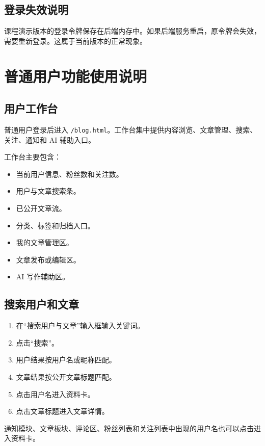 \documentclass[UTF8,a4paper,12pt]{ctexart}
\newcommand{\code}[1]{\texttt{#1}}
\begin{document}
\subsection{登录失效说明}

课程演示版本的登录令牌保存在后端内存中。如果后端服务重启，原令牌会失效，需要重新登录。这属于当前版本的正常现象。

\section{普通用户功能使用说明}

\subsection{用户工作台}

普通用户登录后进入 \code{/blog.html}。工作台集中提供内容浏览、文章管理、搜索、关注、通知和 AI 辅助入口。

工作台主要包含：

\begin{itemize}
  \item 当前用户信息、粉丝数和关注数。
  \item 用户与文章搜索条。
  \item 已公开文章流。
  \item 分类、标签和归档入口。
  \item 我的文章管理区。
  \item 文章发布或编辑区。
  \item AI 写作辅助区。
\end{itemize}

\subsection{搜索用户和文章}

\begin{enumerate}
  \item 在“搜索用户与文章”输入框输入关键词。
  \item 点击“搜索”。
  \item 用户结果按用户名或昵称匹配。
  \item 文章结果按公开文章标题匹配。
  \item 点击用户名进入资料卡。
  \item 点击文章标题进入文章详情。
\end{enumerate}

通知模块、文章板块、评论区、粉丝列表和关注列表中出现的用户名也可以点击进入资料卡。
\end{document}
